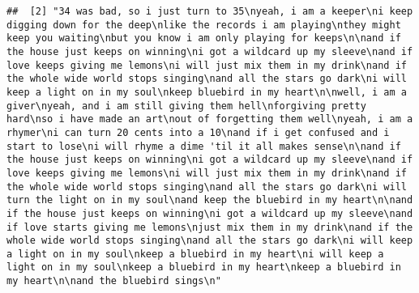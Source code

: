 \documentclass[]{article}
\begin{document}
\begin{verbatim}
##  [2] "34 was bad, so i just turn to 35\nyeah, i am a keeper\ni keep digging down for the deep\nlike the records i am playing\nthey might keep you waiting\nbut you know i am only playing for keeps\n\nand if the house just keeps on winning\ni got a wildcard up my sleeve\nand if love keeps giving me lemons\ni will just mix them in my drink\nand if the whole wide world stops singing\nand all the stars go dark\ni will keep a light on in my soul\nkeep bluebird in my heart\n\nwell, i am a giver\nyeah, and i am still giving them hell\nforgiving pretty hard\nso i have made an art\nout of forgetting them well\nyeah, i am a rhymer\ni can turn 20 cents into a 10\nand if i get confused and i start to lose\ni will rhyme a dime 'til it all makes sense\n\nand if the house just keeps on winning\ni got a wildcard up my sleeve\nand if love keeps giving me lemons\ni will just mix them in my drink\nand if the whole wide world stops singing\nand all the stars go dark\ni will turn the light on in my soul\nand keep the bluebird in my heart\n\nand if the house just keeps on winning\ni got a wildcard up my sleeve\nand if love starts giving me lemons\njust mix them in my drink\nand if the whole wide world stops singing\nand all the stars go dark\ni will keep a light on in my soul\nkeep a bluebird in my heart\ni will keep a light on in my soul\nkeep a bluebird in my heart\nkeep a bluebird in my heart\n\nand the bluebird sings\n"                                                                                                                                                                                                                                                                                                                                                                                                                                                                                                                                                                                                                                                                                                                                                                                                                                                                                                                                                                                                                                                                                                                                                                                                                                                                                                                                                                                                                                                                                                        

\end{verbatim}
\end{document}
